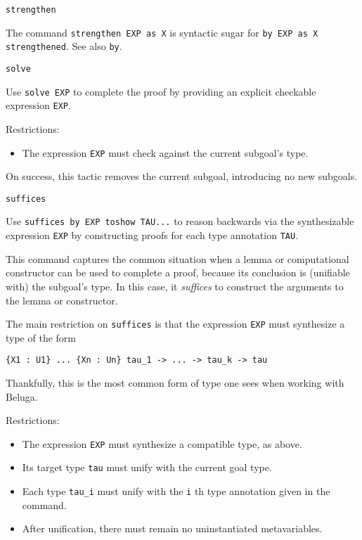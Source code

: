 \begin{description}
\item{\texttt{strengthen}}

The command \texttt{strengthen EXP as X} is syntactic sugar for \texttt{by EXP as X
strengthened}.
See also \texttt{by}.

\item{\texttt{solve}}

Use \texttt{solve EXP} to complete the proof by providing an explicit checkable
expression \texttt{EXP}.

Restrictions:

\begin{itemize}
\item The expression \texttt{EXP} must check against the current subgoal's type.
\end{itemize}

On success, this tactic removes the current subgoal, introducing no new
subgoals.

\item{\texttt{suffices}}

Use \texttt{suffices by EXP toshow TAU...} to reason backwards via the synthesizable
expression \texttt{EXP} by constructing proofs for each type annotation \texttt{TAU}.

This command captures the common situation when a lemma or computational
constructor can be used to complete a proof, because its conclusion is
(unifiable with) the subgoal's type. In this case, it \emph{suffices} to
construct the arguments to the lemma or constructor.

The main restriction on \texttt{suffices} is that the expression \texttt{EXP} must
synthesize a type of the form

\begin{lstlisting}[gobble=4]
    {X1 : U1} ... {Xn : Un} tau_1 -> ... -> tau_k -> tau
  \end{lstlisting}

Thankfully, this is the most common form of type one sees when working with
Beluga.

Restrictions:
\begin{itemize}
\item The expression \texttt{EXP} must synthesize a compatible type, as above.
\item Its target type \texttt{tau} must unify with the current goal type.
\item Each type \texttt{tau_i} must unify with the \texttt{i} th type annotation
  given in the command.
\item After unification, there must remain no uninstantiated metavariables.
\end{itemize}


\end{description}

